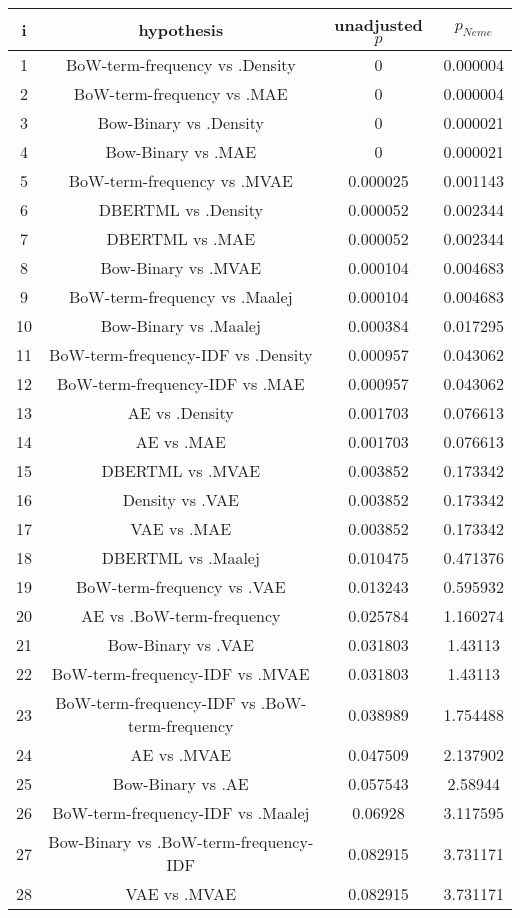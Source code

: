 \documentclass[a4paper,10pt]{article}
\begin{document}
\begin{landscape}
\begin{table}[!htp]
\centering\scriptsize
\begin{tabular}{cccc}
i&hypothesis&unadjusted $p$&$p_{Neme}$\\
\hline1&BoW-term-frequency vs .Density&0&0.000004\\
2&BoW-term-frequency vs .MAE&0&0.000004\\
3&Bow-Binary vs .Density&0&0.000021\\
4&Bow-Binary vs .MAE&0&0.000021\\
5&BoW-term-frequency vs .MVAE&0.000025&0.001143\\
6&DBERTML vs .Density&0.000052&0.002344\\
7&DBERTML vs .MAE&0.000052&0.002344\\
8&Bow-Binary vs .MVAE&0.000104&0.004683\\
9&BoW-term-frequency vs .Maalej&0.000104&0.004683\\
10&Bow-Binary vs .Maalej&0.000384&0.017295\\
11&BoW-term-frequency-IDF vs .Density&0.000957&0.043062\\
12&BoW-term-frequency-IDF vs .MAE&0.000957&0.043062\\
13&AE vs .Density&0.001703&0.076613\\
14&AE vs .MAE&0.001703&0.076613\\
15&DBERTML vs .MVAE&0.003852&0.173342\\
16&Density vs .VAE&0.003852&0.173342\\
17&VAE vs .MAE&0.003852&0.173342\\
18&DBERTML vs .Maalej&0.010475&0.471376\\
19&BoW-term-frequency vs .VAE&0.013243&0.595932\\
20&AE vs .BoW-term-frequency&0.025784&1.160274\\
21&Bow-Binary vs .VAE&0.031803&1.43113\\
22&BoW-term-frequency-IDF vs .MVAE&0.031803&1.43113\\
23&BoW-term-frequency-IDF vs .BoW-term-frequency&0.038989&1.754488\\
24&AE vs .MVAE&0.047509&2.137902\\
25&Bow-Binary vs .AE&0.057543&2.58944\\
26&BoW-term-frequency-IDF vs .Maalej&0.06928&3.117595\\
27&Bow-Binary vs .BoW-term-frequency-IDF&0.082915&3.731171\\
28&VAE vs .MVAE&0.082915&3.731171\\

\end{tabular}
\end{table}
\end{landscape}
\end{document}
